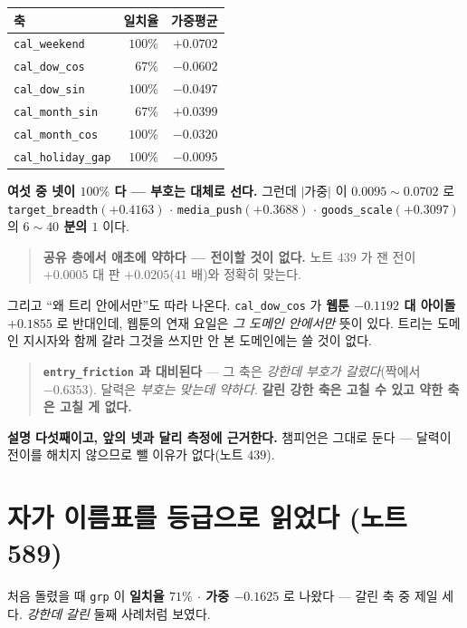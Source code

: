 \documentclass[11pt]{article}
\begin{document}
\begin{center}
\begin{tabular}{lrr}
\hline
축 & 일치율 & 가중평균 \\
\hline
\texttt{cal\_weekend} & $100\%$ & $+0.0702$ \\
\texttt{cal\_dow\_cos} & $67\%$ & $-0.0602$ \\
\texttt{cal\_dow\_sin} & $100\%$ & $-0.0497$ \\
\texttt{cal\_month\_sin} & $67\%$ & $+0.0399$ \\
\texttt{cal\_month\_cos} & $100\%$ & $-0.0320$ \\
\texttt{cal\_holiday\_gap} & $100\%$ & $-0.0095$ \\
\hline
\end{tabular}
\end{center}

\textbf{여섯 중 넷이 $100\%$ 다 --- 부호는 대체로 선다.} 그런데
$|$가중$|$ 이 $0.0095 \sim 0.0702$ 로 \texttt{target\_breadth}$(+0.4163)$
$\cdot$ \texttt{media\_push}$(+0.3688)$ $\cdot$
\texttt{goods\_scale}$(+0.3097)$ 의 \textbf{$6\!\sim\!40$ 분의 $1$} 이다.

\begin{quote}
\textbf{공유 층에서 애초에 약하다 --- 전이할 것이 없다.} 노트 $439$ 가
잰 전이 $+0.0005$ 대 판 $+0.0205$($41$ 배)와 정확히 맞는다.
\end{quote}

그리고 ``왜 트리 안에서만''도 따라 나온다. \texttt{cal\_dow\_cos} 가
\textbf{웹툰 $-0.1192$ 대 아이돌 $+0.1855$} 로 반대인데, 웹툰의 연재 요일은
\emph{그 도메인 안에서만} 뜻이 있다. 트리는 도메인 지시자와 함께 갈라
그것을 쓰지만 안 본 도메인에는 쓸 것이 없다.

\begin{quote}
\textbf{\texttt{entry\_friction} 과 대비된다} --- 그 축은 \emph{강한데
부호가 갈렸다}(짝에서 $-0.6353$). 달력은 \emph{부호는 맞는데 약하다}.
\textbf{갈린 강한 축은 고칠 수 있고 약한 축은 고칠 게 없다.}
\end{quote}

\textbf{설명 다섯째이고, 앞의 넷과 달리 측정에 근거한다.} 챔피언은 그대로
둔다 --- 달력이 전이를 해치지 않으므로 뺄 이유가 없다(노트 $439$).

\section{자가 이름표를 등급으로 읽었다 (노트 589)}

처음 돌렸을 때 \texttt{grp} 이 \textbf{일치율 $71\%$ $\cdot$ 가중
$-0.1625$} 로 나왔다 --- 갈린 축 중 제일 세다. \emph{강한데 갈린} 둘째
사례처럼 보였다.
\end{document}
